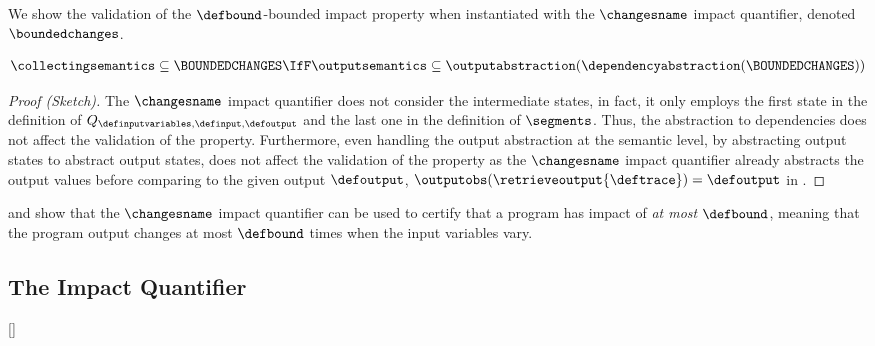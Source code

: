 We show the validation of the $\defbound$-bounded impact property when instantiated with the $\changesname$ impact quantifier,
denoted $\boundedchanges$.

\begin{lemma}
  \begin{align*}
    \collectingsemantics \subseteq \BOUNDEDCHANGES \IfF \outputsemantics \subseteq \outputabstraction(\dependencyabstraction(\BOUNDEDCHANGES))
  \end{align*}
\end{lemma}
\begin{proof}[Proof (Sketch)]
  The $\changesname$ impact quantifier does not consider the intermediate states, in fact, it only employs the first state in the definition of $Q_{\definputvariables, \definput, \defoutput}$ and the last one in the definition of $\segments$.
  Thus, the abstraction to dependencies does not affect the validation of the property.
  Furthermore, even handling the output abstraction at the semantic level, by abstracting output states to abstract output states, does not affect the validation of the property as the $\changesname$ impact quantifier already abstracts the output values before comparing to the given output $\defoutput$, \cf{} $\outputobs(\retrieveoutput{\deftrace}) = \defoutput$ in .
\end{proof}

 and  show that the $\changesname$ impact quantifier can be used to certify that a program has impact of \emph{at most} $\defbound$, meaning that the program output changes at most $\defbound$ times when the input variables vary.


\subsection{The \qlibraname{} Impact Quantifier}[\qlibraname]


